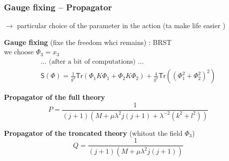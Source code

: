 \documentclass[9pt]{beamer}
\newcommand{\Ssf}{\mathsf{S}}
\begin{document}
\begin{frame}

\frametitle{Gauge fixing -- Propagator}

\vfill

$\to$ particular choice of the parameter in the action (ta make life easier \smiley )

\vfill

\textbf{Gauge fixing} (fixe the freedom whci remains) :  BRST \\
we choose $\Phi_3 = x_3$
\vspace*{-6pt}
\begin{eqnarray*}
&\dots \mbox{ (after a bit of computations) } \dots& \\
&\Ssf(\Phi) = \frac{1}{g^2} \mathsf{Tr}\left( \Phi_1 K \Phi_1 + \Phi_2 K \Phi_2 \right) + \frac{4}{g^2} \mathsf{Tr}\left(\left(\Phi_1^2 + \Phi_2^2\right)^2\right) &
\end{eqnarray*}

\vfill

\textbf{Propagator of the full theory}
%
\begin{equation*}
P = \frac{1}{(j+1)\left( M + \mu \lambda^2 j (j+1) + \lambda^{-2} (k^2+l^2) \right)}
\end{equation*}


\textbf{Propagator of the troncated theory} (whitout the field $\Phi_3$)
%
\begin{equation*}
Q = \frac{1}{(j+1)\left( M + \mu \lambda^2 j (j+1) \right)}
\end{equation*}

\vfill 
 
\end{frame}


\end{document}
